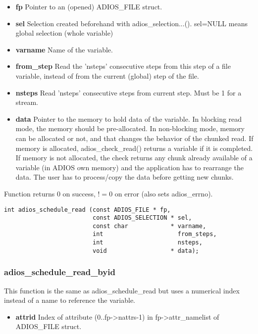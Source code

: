 \begin{itemize}
\item{\bf  fp}         Pointer to an (opened) ADIOS\_FILE struct.
\item{\bf  sel}        Selection created beforehand with adios\_selection...().
                 sel=NULL means global selection (whole variable)
\item{\bf  varname}    Name of the variable.
\item{\bf  from\_step}  Read the 'nsteps' consecutive steps from this 
step of a file variable, instead of from the current (global) step of the file.
\item{\bf nsteps}     Read 'nsteps' consecutive steps from current step. Must be 1 for a stream. 
\item{\bf data} Pointer to the memory to hold data of the variable. 
In blocking read mode, the memory should be 
pre-allocated. In non-blocking mode, memory can be
allocated or not, and that changes the behavior of
the chunked read. If memory is allocated, 
adios\_check\_read() returns a variable if it is completed.
If memory is not allocated, the check returns any chunk
already available of a variable (in ADIOS own memory)
and the application has to rearrange the data. The user
has to process/copy the data before getting new chunks.
\end{itemize}
Function returns 0 on success, $!=0$ on error (also sets adios\_errno).

\begin{lstlisting}[language=ADIOS]
int adios_schedule_read (const ADIOS_FILE * fp,
                         const ADIOS_SELECTION * sel,
                         const char            * varname,
                         int                     from_steps,
                         int                     nsteps,
                         void                  * data);
\end{lstlisting}

\subsubsection*{adios\_schedule\_read\_byid}
This function is the same as adios\_schedule\_read but uses a numerical index instead of a name to reference the variable. 
\begin{itemize}
\item{\bf attrid} Index of attribute (0..fp->nattrs-1) in fp->attr\_namelist of ADIOS\_FILE struct. 
\end{itemize}

